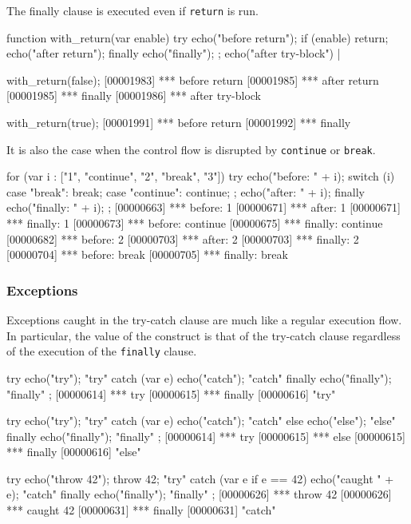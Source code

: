 The finally clause is executed even if \lstinline|return| is run.

\begin{urbiscript}
function with_return(var enable)
{
  try
  {
    echo("before return");
    if (enable)
      return;
    echo("after return");
  }
  finally
  {
    echo("finally");
  };
  echo("after try-block")
}|

with_return(false);
[00001983] *** before return
[00001985] *** after return
[00001985] *** finally
[00001986] *** after try-block

with_return(true);
[00001991] *** before return
[00001992] *** finally
\end{urbiscript}

It is also the case when the control flow is disrupted by
\lstinline|continue| or \lstinline|break|.

\begin{urbiscript}
for (var i : ["1", "continue", "2", "break", "3"])
  try
  {
    echo("before:  " + i);
    switch (i)
    {
      case "break":    break;
      case "continue": continue;
    };
    echo("after:   " + i);
  }
  finally
  {
    echo("finally: " + i);
  };
[00000663] *** before:  1
[00000671] *** after:   1
[00000671] *** finally: 1
[00000673] *** before:  continue
[00000675] *** finally: continue
[00000682] *** before:  2
[00000703] *** after:   2
[00000703] *** finally: 2
[00000704] *** before:  break
[00000705] *** finally: break
\end{urbiscript}


\subsubsection{Exceptions}

Exceptions caught in the try-catch clause are much like a regular execution
flow.  In particular, the value of the construct is that of the try-catch
clause regardless of the execution of the \lstinline|finally| clause.

\begin{urbiscript}
try           { echo("try");     "try" }
catch (var e) { echo("catch");   "catch" }
finally       { echo("finally"); "finally" };
[00000614] *** try
[00000615] *** finally
[00000616] "try"

try           { echo("try");     "try" }
catch (var e) { echo("catch");   "catch" }
else          { echo("else");    "else" }
finally       { echo("finally"); "finally" };
[00000614] *** try
[00000615] *** else
[00000615] *** finally
[00000616] "else"

try                      { echo("throw 42"); throw 42; "try" }
catch (var e if e == 42) { echo("caught " + e);        "catch" }
finally                  { echo("finally");            "finally" };
[00000626] *** throw 42
[00000626] *** caught 42
[00000631] *** finally
[00000631] "catch"
\end{urbiscript}


